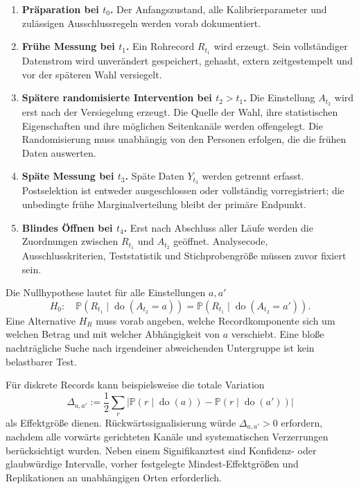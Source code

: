 \documentclass[11pt,a4paper]{article}
\theoremstyle{remark}
\begin{document}
\begin{enumerate}
  \item \textbf{Präparation bei \(t_0\).}
  Der Anfangszustand, alle Kalibrierparameter und zulässigen Ausschlussregeln
  werden vorab dokumentiert.

  \item \textbf{Frühe Messung bei \(t_1\).}
  Ein Rohrecord \(R_{t_1}\) wird erzeugt. Sein vollständiger Datenstrom wird
  unverändert gespeichert, gehasht, extern zeitgestempelt und vor der späteren
  Wahl versiegelt.

  \item \textbf{Spätere randomisierte Intervention bei \(t_2>t_1\).}
  Die Einstellung \(A_{t_2}\) wird erst nach der Versiegelung erzeugt. Die
  Quelle der Wahl, ihre statistischen Eigenschaften und ihre möglichen
  Seitenkanäle werden offengelegt. Die Randomisierung muss unabhängig von den
  Personen erfolgen, die die frühen Daten auswerten.

  \item \textbf{Späte Messung bei \(t_3\).}
  Späte Daten \(Y_{t_3}\) werden getrennt erfasst. Postselektion ist entweder
  ausgeschlossen oder vollständig vorregistriert; die unbedingte frühe
  Marginalverteilung bleibt der primäre Endpunkt.

  \item \textbf{Blindes Öffnen bei \(t_4\).}
  Erst nach Abschluss aller Läufe werden die Zuordnungen zwischen
  \(R_{t_1}\) und \(A_{t_2}\) geöffnet. Analysecode, Ausschlusskriterien,
  Teststatistik und Stichprobengröße müssen zuvor fixiert sein.
\end{enumerate}

Die Nullhypothese lautet für alle Einstellungen \(a,a'\)
\begin{equation}
\label{eq:retro-null}
 H_0:\quad
 \mathbb P(R_{t_1}\mid\operatorname{do}(A_{t_2}=a))
 =
 \mathbb P(R_{t_1}\mid\operatorname{do}(A_{t_2}=a')).
\end{equation}
Eine Alternative \(H_R\) muss vorab angeben, welche Recordkomponente sich um
welchen Betrag und mit welcher Abhängigkeit von \(a\) verschiebt. Eine bloße
nachträgliche Suche nach irgendeiner abweichenden Untergruppe ist kein
belastbarer Test.

Für diskrete Records kann beispielsweise die totale Variation
\begin{equation}
\label{eq:retro-tv}
  \Delta_{a,a'}
  :=\frac12\sum_r
  \left|
  \mathbb P(r\mid\operatorname{do}(a))
  -\mathbb P(r\mid\operatorname{do}(a'))
  \right|
\end{equation}
als Effektgröße dienen. Rückwärtssignalisierung würde
\(\Delta_{a,a'}>0\) erfordern, nachdem alle vorwärts gerichteten Kanäle und
systematischen Verzerrungen berücksichtigt wurden. Neben einem Signifikanztest
sind Konfidenz- oder glaubwürdige Intervalle, vorher festgelegte
Mindest-Effektgrößen und Replikationen an unabhängigen Orten erforderlich.
\end{document}
